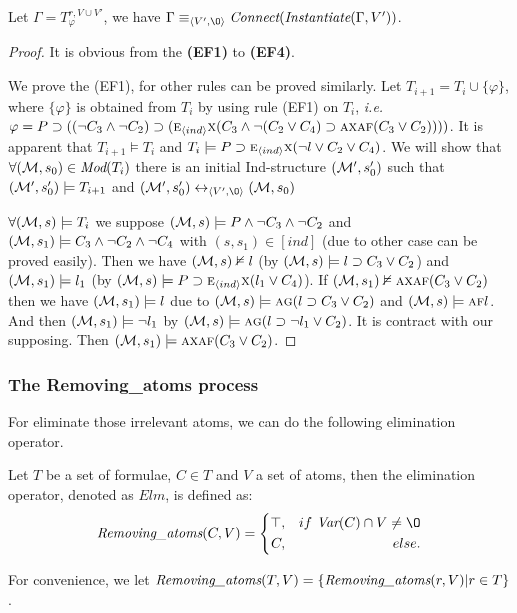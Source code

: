 \documentclass[runningheads]{llncs}
\newcommand{\tuple}[1]{{\langle{#1}\rangle}}
\newcommand{\Mod}{\textit{Mod}}
\newcommand\ie{{\it i.e. }}
\newcommand{\lrto}{\leftrightarrow}
\newcommand{\Var}{\textit{Var}}
\newcommand{\Hm} {{\cal M}}
\newcommand{\Elm}{\textit{Elm}}
\newcommand{\ALL}{\textsc{a}}
\newcommand{\EXIST}{\textsc{e}}
\newcommand{\NEXT}{\textsc{x}}
\newcommand{\FUTURE}{\textsc{f}}
\newcommand{\GLOBAL}{\textsc{g}}
\begin{document}
\begin{proposition} \label{pro:EF}
Let $\Gamma=T_{\varphi}^{r,V \cup V'}$, we have $\Gamma \equiv_{\tuple{V', {\O}}}\emph{Connect}(\emph{Instantiate}(\Gamma, V'))$.
\end{proposition}
\begin{proof}
It is obvious from the  \textbf{(EF1)} to \textbf{(EF4)}.

We prove the (EF1), for other rules can be proved similarly.
Let $T_{i+1}=T_i \cup \{\varphi\}$, where $\{\varphi\}$ is obtained from $T_i$ by using rule (EF1) on $T_i$, \ie $\varphi =P \supset ((\neg C_3 \wedge \neg C_2) \supset  (\EXIST_{\tuple{ind}}\NEXT(C_3 \wedge \neg (C_2 \vee C_4) \supset \ALL\NEXT \ALL\FUTURE(C_3 \vee C_2))))$.
It is apparent that $T_{i+1} \models T_i$ and $T_i \models P\supset \EXIST_{\tuple{ind}}\NEXT (\neg l \vee C_2 \vee C_4)$.
We will show that $\forall (\Hm, s_0) \in \Mod(T_i)$ there is an initial Ind-structure $(\Hm',s_0')$ such that $(\Hm',s_0') \models T_{i+1}$ and $(\Hm',s_0') \lrto_{\tuple{V', {\O}}} (\Hm, s_0)$

$\forall (\Hm, s) \models T_i$ we suppose $(\Hm, s) \models P \wedge \neg C_3 \wedge \neg C_2$ and $(\Hm, s_1)\models C_3 \wedge \neg C_2 \wedge \neg C_4$ with $(s, s_1) \in [ind]$ (due to other case can be proved easily).
Then we have $(\Hm, s) \nvDash l$ (by $(\Hm, s) \models l \supset C_3 \vee C_2$) and $(\Hm,s_1) \models l_1$ (by $(\Hm, s) \models P\supset \EXIST_{\tuple{ind}}\NEXT (l_1 \vee C_4)$).
If $(\Hm,s_1) \nvDash \ALL\NEXT \ALL\FUTURE(C_3 \vee C_2)$ then we have $(\Hm, s_1) \models l$ due to $(\Hm, s) \models \ALL\GLOBAL(l\supset C_3 \vee C_2)$ and $(\Hm, s)\models \ALL\FUTURE l$.
And then $(\Hm, s_1) \models \neg l_1$ by $(\Hm,s) \models \ALL \GLOBAL(l\supset \neg l_1 \vee C_2)$.
It is contract with our supposing.
Then $(\Hm,s_1) \models \ALL\NEXT \ALL\FUTURE(C_3 \vee C_2)$.


\end{proof}


\subsubsection{The Removing\_atoms process}
For eliminate those irrelevant atoms, we can do the following elimination operator.
\begin{definition}\label{def:Elm}
Let $T$ be a set of formulae, $C \in T$ and $V$ a set of atoms, then the elimination operator, denoted as $\Elm$, is defined as:
$$ \emph{Removing\_atoms}(C, V)=\left\{
\begin{aligned}
\top, && if\ \Var(C) \cap V \neq {\O} \\
C, && else.
\end{aligned}
\right.
$$
\end{definition}
For convenience, we let $\emph{Removing\_atoms}(T, V) = \{\emph{Removing\_atoms}(r, V) | r \in T\}$.
\end{document}
